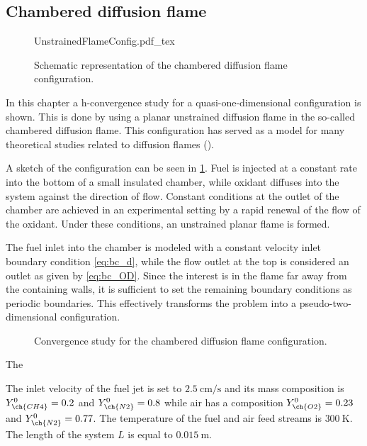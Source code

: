 
\subsection{Chambered diffusion flame}\label{ss:UDF}
\begin{figure}[b]
	\begin{center}
		\def\svgwidth{0.4\textwidth}
		{UnstrainedFlameConfig.pdf_tex}
		\caption{Schematic representation of the chambered diffusion flame configuration. }
		\label{fig:chamberedDifFlame}
	\end{center}
\end{figure}
In this chapter a h-convergence study for a quasi-one-dimensional configuration is shown. This is done by using a planar unstrained diffusion flame in the so-called chambered diffusion flame. This configuration has served as a model for many theoretical studies related to diffusion flames (\cite{matalonEffectThermalExpansion2010,rameauNumericalBifurcationChambered1985,matalonDiffusionFlamesChamber1980}). 

A sketch of the configuration can be seen in \cref{fig:chamberedDifFlame}. Fuel is injected at a constant rate into the bottom of a small insulated chamber, while oxidant diffuses into the system against the direction of flow. Constant conditions at the outlet of the chamber are achieved in an experimental setting by a rapid renewal of the flow of the oxidant. Under these conditions, an unstrained planar flame is formed.

The fuel inlet into the chamber is modeled with a constant velocity inlet boundary condition \cref{eq:bc_d}, while the flow outlet at the top is considered an outlet as given by \cref{eq:bc_OD}. Since the interest is in the flame far away from the containing walls, it is sufficient to set the remaining boundary conditions as periodic boundaries. This effectively transforms the problem into a pseudo-two-dimensional configuration.

\begin{figure}[t!]
	\centering
	\pgfplotsset{width=0.34\textwidth, compat=1.3}
	\caption{Convergence study for the chambered diffusion flame configuration.}
	\label{ConvergenceDiffFlame}
\end{figure}
The 

The inlet velocity of the fuel jet is set to $\SI{2.5}{\centi\meter \per \second}$ and its mass composition is $Y^0_{\ch{CH4}} = 0.2$ and $Y^0_{\ch{N2}} = 0.8$ while air has a composition $Y^0_{\ch{O2}} = 0.23$ and $Y^0_{\ch{N2}} = 0.77$. The temperature of the fuel and air feed streams is $\SI{300}{\kelvin}$. The length of the system $L$ is equal to $\SI{0.015}{\meter}$.

